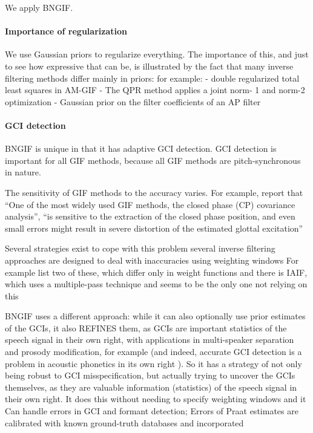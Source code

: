 \begin{chaptersections}{%
We apply BNGIF.
}
\paragraph{Importance of regularization}
We use Gaussian priors to regularize everything.
The importance of this, and just to see how expressive that can be, is illustrated by the fact that many inverse filtering methods differ mainly in priors: for example:
- double regularized total least squares in AM-GIF \citep{Bleyer2017}
- The QPR method applies a joint norm-
1 and norm-2 optimization \citep{Airaksinen2017}
- Gaussian prior on the filter coefficients of an AP filter \cite{Rao2018}

\paragraph{GCI detection}
BNGIF is unique in that it has adaptive GCI detection.
GCI detection is important for all GIF methods, because all GIF methods are pitch-synchronous in nature.

The sensitivity of GIF methods to the accuracy varies.
For example, \cite{Drugman2019} report that ``One of the most widely used GIF methods, the closed phase (CP) covariance analysis'', ``is sensitive to the extraction
of the closed phase position, and even small errors might result in severe
distortion of the estimated glottal excitation''

Several strategies exist to cope with this problem
several inverse filtering approaches are designed to deal with inaccuracies using weighting windows \cite{Drugman2019}
For example \citep{Chien2017} list two of these, which differ only in weight functions
and there is IAIF, which uses a multiple-pass technique and seems to be the only one not relying on this

BNGIF uses a different approach: while it can also optionally use prior estimates of the GCIs, it also REFINES them, as GCIs are important statistics of the speech signal in their own right, with applications in multi-speaker separation and prosody modification, for example \citep{Rao2006} (and indeed, accurate GCI detection is a problem in acoustic phonetics in its own right \citep{Drugman2012}).
So it has a strategy of not only being robust to GCI misspecification, but actually trying to uncover the GCIs themselves, as they are valuable information (statistics) of the speech signal in their own right.
It does this without needing to specify weighting windows and it Can handle errors in GCI and formant detection; Errors of Praat estimates are calibrated with known ground-truth databases and incorporated


\end{chaptersections}
